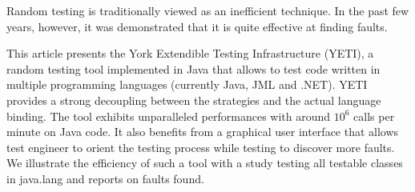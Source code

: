 Random testing is traditionally viewed as an inefficient technique. In the past few years, however, it was demonstrated that it is quite effective at finding faults. 

This article presents the York Extendible Testing Infrastructure (YETI), a random testing tool implemented in Java that allows to test code written in multiple programming languages (currently Java, JML and .NET). YETI provides a strong decoupling between the strategies and the actual language binding. The tool exhibits unparalleled performances with around $10^6$ calls per minute on Java code. It also benefits from a graphical user interface that allows test engineer to orient the testing process while testing to discover more faults. We illustrate the efficiency of such a tool  with a study testing all testable classes in java.lang and reports on faults found.
